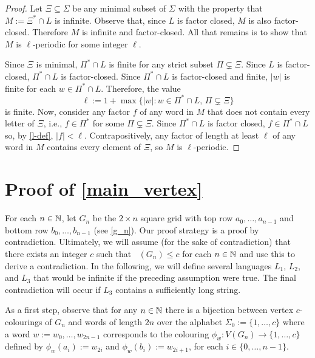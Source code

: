 \documentclass{patmorin}
\DeclareMathOperator{\afcn}{\dot{\chi}_\pi}
\begin{document}
\begin{proof}
    Let $\Xi\subseteq\Sigma$ be any minimal subset of $\Sigma$ with the property that $M:=\Xi^* \cap L$ is infinite.  Observe that, since $L$ is factor closed, $M$ is also factor-closed.  Therefore $M$ is infinite and factor-closed.  All that remains is to show that $M$ is $\ell$-periodic for some integer $\ell$.

    Since $\Xi$ is minimal, $\Pi^*\cap L$ is finite for any strict subset $\Pi\subsetneq \Xi$.  Since $L$ is factor-closed, $\Pi^*\cap L$ is factor-closed.  Since $\Pi^*\cap L$ is factor-closed and finite, $|w|$ is finite for each $w\in\Pi^*\cap L$.
    Therefore, the value
    \begin{equation}
        \ell:=1+\max\{|w|: w\in \Pi^*\cap L,\, \Pi\subsetneq\Xi\} \label{l-def}
    \end{equation}
    is finite.  Now, consider any factor $f$ of any word in $M$ that does not contain every letter of $\Xi$, i.e., $f\in\Pi^*$ for some  $\Pi\subsetneq\Xi$.  Since $\Pi^*\cap L$ is factor closed, $f\in \Pi^*\cap L$ so, by \cref{l-def}, $|f| < \ell$.  Contrapositively, any factor of length at least $\ell$ of any word in $M$ contains every element of $\Xi$, so $M$ is $\ell$-periodic.
\end{proof}


\section{Proof of \cref{main_vertex}}
\label{vertex_colourings}

For each $n\in\mathbb{N}$, let $G_n$ be the $2\times n$ square grid with top row $a_0,\ldots,a_{n-1}$ and bottom row $b_0,\ldots,b_{n-1}$ (see \cref{g_n}).  Our proof strategy is a proof by contradiction.  Ultimately, we will assume (for the sake of contradiction) that there exists an integer $c$ such that $\afcn(G_n)\le c$ for each $n\in\mathbb{N}$ and use this to derive a contradiction.  In the following, we will define several languages $L_1$, $L_2$, and $L_3$ that would be infinite if the preceding assumption were true.  The final contradiction will occur if $L_3$ contains a sufficiently long string.

As a first step, observe that for any $n\in\mathbb{N}$ there is a bijection between vertex $c$-colourings of $G_n$ and words of length $2n$ over the alphabet $\Sigma_0:=\{1,\ldots,c\}$ where a word $w:=w_0,\ldots,w_{2n-1}$ corresponds to the colouring $\phi_w:V(G_n)\to\{1,\ldots,c\}$ defined by
$\phi_w(a_i):=w_{2i}$ and $\phi_w(b_i):=w_{2i+1}$, for each $i\in\{0,\ldots,n-1\}$.  
\end{document}
